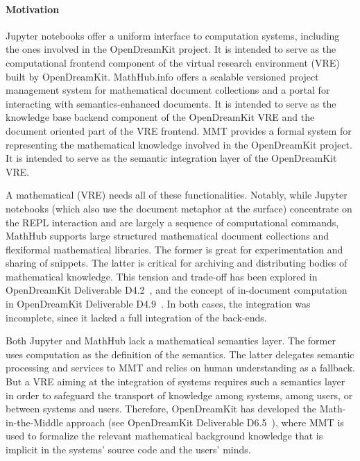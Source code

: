 
\paragraph{Motivation}
Jupyter notebooks offer a uniform interface to computation systems, including the ones involved in the OpenDreamKit project.
It is intended to serve as the computational frontend component of the virtual research environment (VRE) built by OpenDreamKit.
MathHub.info offers a scalable versioned project management system for mathematical document collections and a portal for interacting with semantics-enhanced documents. 
It is intended to serve as the knowledge base backend component of the OpenDreamKit VRE and the document oriented part of the VRE frontend.
MMT provides a formal system for representing the mathematical knowledge involved in the OpenDreamKit project.
It is intended to serve as the semantic integration layer of the OpenDreamKit VRE.

A mathematical (VRE) needs all of these functionalities.
Notably, while Jupyter notebooks (which also use the document metaphor at the surface) concentrate on the REPL interaction and are largely a sequence of computational commands, MathHub supports large structured mathematical document collections and flexiformal mathematical libraries.
The former is great for experimentation and sharing of snippets. The latter is critical for archiving and distributing bodies of mathematical knowledge.
This tension and trade-off has been explored in OpenDreamKit Deliverable D4.2~\cite{ODK-D4.2}, and the concept of in-document computation in OpenDreamKit Deliverable D4.9~\cite{ODK-D4.9}.
In both cases, the integration was incomplete, since it lacked a full integration of the back-ends.

Both Jupyter and MathHub lack a mathematical semantics layer.
The former uses computation as the definition of the semantics.
The latter delegates semantic processing and services to MMT  and relies on human understanding as a fallback.
But a VRE aiming at the integration of systems requires such a semantics layer in order to safeguard the transport of knowledge among systems, among users, or between systems and users.
Therefore, OpenDreamKit has developed the Math-in-the-Middle approach (see OpenDreamKit Deliverable D6.5~\cite{ODK-D6.5}), where MMT is used to formalize the relevant mathematical background knowledge that is implicit in the systems' source code and the users' minds.

